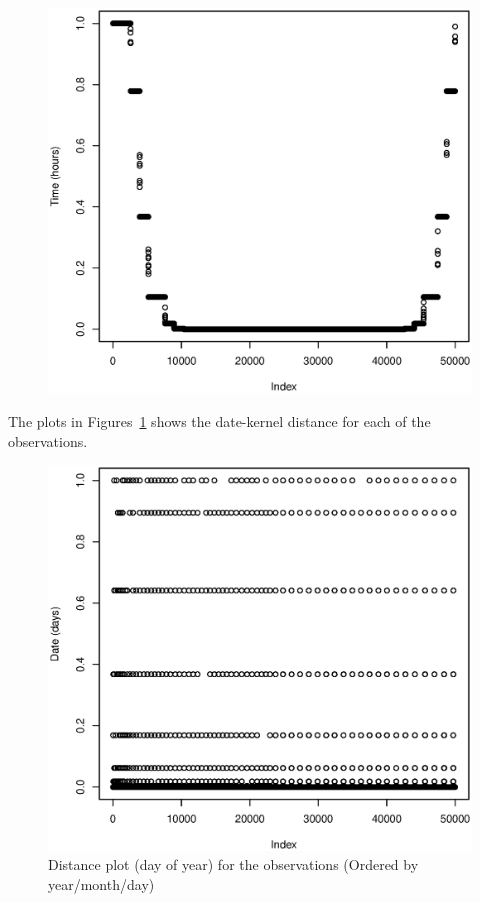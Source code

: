 \documentclass[a4paper, twocolumn]{article}
\begin{document}
\begin{figure}[!ht]
\begin{minipage}[]{0.2\textwidth}
	    \end{minipage}
	    \begin{minipage}[]{0.4\textwidth}
	    	\includegraphics[width=\textwidth]{share/11_time.eps}
	    \end{minipage}
    \end{figure}

    The plots in Figures~\ref{fig:day} shows the date-kernel distance for each of the observations.  
    \begin{figure}[!h]
    \centering
    \caption{Distance plot (day of year) for the observations (Ordered by year/month/day)\label{fig:day}}
	    \begin{minipage}[]{0.4\textwidth}
	    	\includegraphics[width=\textwidth]{share/1_date.eps}
	    \end{minipage}
    \end{figure}
\end{document}
